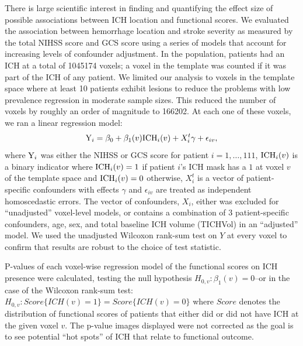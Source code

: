 \documentclass[10pt]{article}\usepackage[]{graphicx}\usepackage[]{color}
\begin{document}
There is large scientific interest in finding and quantifying the effect size of possible associations between ICH location and functional scores.  We evaluated the association between hemorrhage location and stroke severity as measured by the total NIHSS score and GCS score using a series of models that account for increasing levels of confounder adjustment.  In the population, patients had an ICH at a total of 1045174 voxels; a voxel in the template was counted if it was part of the ICH of any patient.  We limited our analysis to voxels in the template space where at least 10 patients exhibit lesions to reduce the problems with low prevalence regression in moderate sample sizes.
This reduced the number of voxels by roughly an order of magnitude to 166202. At each one of these voxels, we ran a linear regression model:
\begin{equation}\label{eq:nihss_regression}
{\rm Y}_i=\beta_0+\beta_1(v) {\rm ICH}_i(v)+X^t_i \gamma + \epsilon_{iv}, 
\end{equation}
where ${\rm Y}_i$ was either the NIHSS or GCS score for patient $i=1,\ldots,111$, ${\rm ICH}_i(v)$ is a binary indicator where ${\rm ICH}_i(v) = 1$ if patient $i$'s ICH mask has a $1$ at voxel $v$ of the template space and ${\rm ICH}_i(v) = 0$ otherwise, $X^t_i$ is a vector of patient-specific confounders with effects $\gamma$ and $\epsilon_{iv}$ are treated as independent homoscedastic errors.  The vector of confounders, $X_i$, either was excluded for ``unadjusted'' voxel-level models, or contains a combination of $3$ patient-specific confounders, age, sex, and total baseline ICH volume (TICHVol) in an ``adjusted'' model.  We used the unadjusted Wilcoxon rank-sum test on $Y$ at every voxel to confirm that results are robust to the choice of test statistic.


P-values of each voxel-wise regression model of the functional scores on ICH presence were calculated, testing the null hypothesis $H_{0,v}:\beta_1(v)=0$--or in the case of the Wilcoxon rank-sum test: $H_{0,v}: Score\{ICH(v) = 1\} = Score\{ICH(v) = 0\}$ where $Score$ denotes the distribution of functional scores of patients that either did or did not have ICH at the given voxel $v$.  The p-value images displayed were not corrected as the goal is to see potential ``hot spots'' of ICH that relate to functional outcome.
\end{document}
